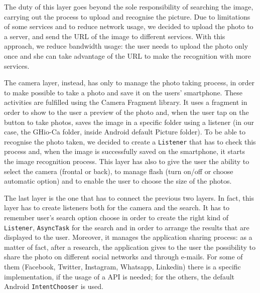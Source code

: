 The duty of this layer goes beyond the sole responsibility of searching the 
image, carrying out the process to upload and recognise the picture.
Due to limitations of some services and to reduce network usage, we decided 
to upload the photo to a server, and send the URL of the image to different 
services.
With this approach, we reduce bandwidth usage: the user needs to upload the
photo only once and she can take advantage of the URL to make the recognition 
with more services.

The camera layer, instead, has only to manage the photo taking process, in order
to make possible to take a photo and save it on the users' smartphone. These
activities are fulfilled using the Camera Fragment library. It uses a fragment
in order to show to the user a preview of the photo and, when the user tap on
the button to take photos, saves the image in a specific folder using a
listener (in our case, the GHio-Ca folder, inside Android default Picture
folder). To be able to recognise the photo taken, we decided to create a
\texttt{Listener} that has to check this process and, when the image is 
successfully saved on the smartphone, it starts the image recognition process.
This layer has also to give the user the ability to select the camera (frontal
or back), to manage flash (turn on/off or choose automatic option) and to enable
the user to choose the size of the photos.

The last layer is the one that has to connect the previous two layers. In fact,
this layer has to create listeners both for the camera and the search. It has
to remember user's search option choose in order to create the right kind of
\texttt{Listener}, \texttt{AsyncTask} for the search and in order to arrange the 
results that are displayed to the user. Moreover, it manages the application
sharing process: as a matter of fact, after a research, the application gives 
to the user the possibility to share the photo on different social networks and
through e-mails. For some of them (Facebook, Twitter, Instagram, Whatsapp,
Linkedin) there is a specific implementation, if the usage of a API is needed;
for the others, the default Android \texttt{IntentChooser} is used.
